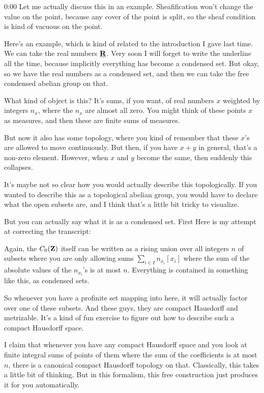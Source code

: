 \begin{unfinished}{0:00}
Let me actually discuss this in an example. Sheafification won't change the value on the point, because any cover of the point is split, so the sheaf condition is kind of vacuous on the point.

Here's an example, which is kind of related to the introduction I gave last time. We can take the real numbers $\underline{\mathbf R}$. Very soon I will forget to write the underline all the time, because implicitly everything has become a condensed set. But okay, so we have the real numbers as a condensed set, and then we can take the free condensed abelian group on that.

What kind of object is this? It's sums, if you want, of real numbers $x$ weighted by integers $n_x$, where the $n_x$ are almost all zero. You might think of these points $x$ as measures, and then these are finite sums of measures.

But now it also has some topology, where you kind of remember that these $x$'s are allowed to move continuously. But then, if you have $x + y$ in general, that's a non-zero element. However, when $x$ and $y$ become the same, then suddenly this collapses.

It's maybe not so clear how you would actually describe this topologically. If you wanted to describe this as a topological abelian group, you would have to declare what the open subsets are, and I think that's a little bit tricky to visualize.

But you can actually say what it is as a condensed set. First
Here is my attempt at correcting the transcript:

Again, the $C_0(\mathbf Z)$ itself can be written as a rising union over all integers $n$ of subsets where you are only allowing sums $\sum_{i\in I} n_{x_i}[x_i]$ where the sum of the absolute values of the $n_{x_i}$'s is at most $n$. Everything is contained in something like this, as condensed sets.

So whenever you have a profinite set mapping into here, it will actually factor over one of these subsets. And these guys, they are compact Hausdorff and metrizable. It's a kind of fun exercise to figure out how to describe such a compact Hausdorff space.

I claim that whenever you have any compact Hausdorff space and you look at finite integral sums of points of them where the sum of the coefficients is at most $n$, there is a canonical compact Hausdorff topology on that. Classically, this takes a little bit of thinking. But in this formalism, this free construction just produces it for you automatically.


\end{unfinished}
